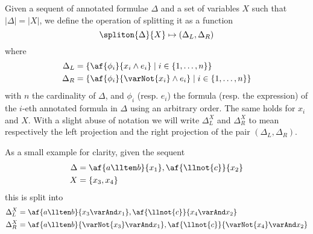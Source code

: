 \begin{define}[Splitting]
	\label{def:split}
	Given a sequent of annotated formulae $\Delta$ and a set of variables $X$ such that $|\Delta| = |X|$, we define the operation of splitting it as a function
	$$ \spliton{\Delta}{X} \mapsto (\Delta_L, \Delta_R) $$
	where
	\begin{align*}
		\Delta_L &= \{ \af{\phi_i}{x_i \wedge e_i} \mid i \in \{1, \dots, n\}\} \\
		\Delta_R &= \{ \af{\phi_i}{\varNot{x_i} \wedge e_i} \mid i \in \{1, \dots, n\}\}
	\end{align*}
	with $n$ the cardinality of $\Delta$, and $\phi_i$ (resp. $e_i$) the formula (resp. the expression) of the $i$-eth annotated formula in $\Delta$ using an arbitrary order.
	The same holds for $x_i$ and $X$.
	With a slight abuse of notation we will write $\Delta_L^X$ and $\Delta_R^X$ to mean respectively the left projection and the right projection of the pair $(\Delta_L, \Delta_R)$.
\end{define}
As a small example for clarity, given the sequent
\begin{align*}
	\Delta &= \af{a \llten b}{x_1}, \af{\llnot{c}}{x_2} \\
	X      &= \{ x_3, x_4 \} 
\end{align*}
this is split into
\begin{align*}
	\Delta_L^X &= \af{a \llten b}{x_3 \varAnd x_1}, \af{\llnot{c}}{x_4 \varAnd x_2} \\
	\Delta_R^X &= \af{a \llten b}{\varNot{x_3} \varAnd x_1}, \af{\llnot{c}}{\varNot{x_4} \varAnd x_2} 
\end{align*}

